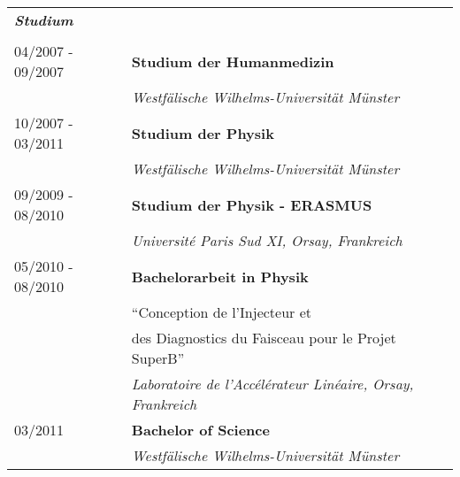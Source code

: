 \begin{table}[h]
\begin{tabular}{ll}
\multicolumn{2}{l}{\textit{\textbf{Studium}}}\\
 & \\
04/2007 - 09/2007 & \textbf{Studium der Humanmedizin} \\
 &  \textit{Westf\"{a}lische Wilhelms-Universit\"{a}t M\"{u}nster} \\
 10/2007 - 03/2011 & \textbf{Studium der Physik}\\
 &  \textit{Westf\"{a}lische Wilhelms-Universit\"{a}t M\"{u}nster}  \\
 09/2009 - 08/2010 & \textbf{Studium der Physik - ERASMUS}\\
 &  \textit{Universit\'{e} Paris Sud XI, Orsay, Frankreich}  \\
 05/2010 - 08/2010 & \textbf{Bachelorarbeit in Physik}\\
  &  ``Conception de l'Injecteur et
  \\
 &  des Diagnostics du Faisceau pour le Projet SuperB'' \\
 &  \textit{Laboratoire de l'Acc\'{e}l\'{e}rateur Lin\'{e}aire, Orsay, Frankreich}  \\
 \phantom{10/2007 - }03/2011 & \textbf{Bachelor of Science}\\
 &  \textit{Westf\"{a}lische Wilhelms-Universit\"{a}t M\"{u}nster}  \\
\end{tabular}
\end{table}


\newpage 
\thispagestyle{empty}

